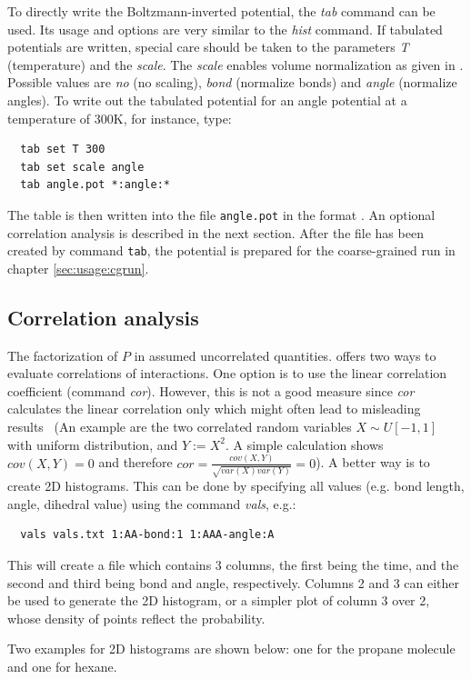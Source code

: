 To directly write the Boltzmann-inverted potential, the \textit{tab} command can be used. Its usage and options are very similar to the \textit{hist} command. If tabulated potentials are written, special care should be taken to the parameters \textit{T} (temperature) and the \textit{scale}. The \textit{scale} enables volume normalization as given in . Possible values are \textit{no} (no scaling), \textit{bond} (normalize bonds) and \textit{angle} (normalize angles). To write out the tabulated potential for an angle potential at a temperature of 300K, for instance, type:
\begin{verbatim}
  tab set T 300
  tab set scale angle
  tab angle.pot *:angle:*
\end{verbatim}
The table is then written into the file \texttt{angle.pot} in the format \todo. An optional correlation analysis is described in the next section. After the file has been created by command \texttt{tab}, the potential is prepared for the coarse-grained run in chapter \ref{sec:usage:cgrun}.

\subsection{Correlation analysis}
The factorization of $P$ in  assumed uncorrelated quantities.  offers two ways to evaluate correlations of interactions. One option is to use the linear correlation coefficient (command \textit{cor}). However, this is not a good measure since \textit{cor} calculates the linear correlation only which might often lead to misleading results~\cite{Ruehle:2009.a} (An example are the two correlated random variables $X \sim U[-1,1]$ with uniform distribution, and $Y:=X^2$. A simple calculation shows $cov(X,Y)=0$ and therefore $cor=\frac{cov(X,Y)}{\sqrt{var(X)var(Y)}}=0$). A better way is to create 2D histograms. This can be done by specifying all values (e.g. bond length, angle, dihedral value) using the command \textit{vals}, e.g.:
\begin{verbatim}
  vals vals.txt 1:AA-bond:1 1:AAA-angle:A
\end{verbatim}
This will create a file which contains 3 columns, the first being the time, and the second and third being bond and angle, respectively. Columns 2 and 3 can either be used to generate the 2D histogram, or a simpler plot of column 3 over 2, whose density of points reflect the probability.

Two examples for 2D histograms are shown below: one for the propane molecule and one for hexane.

